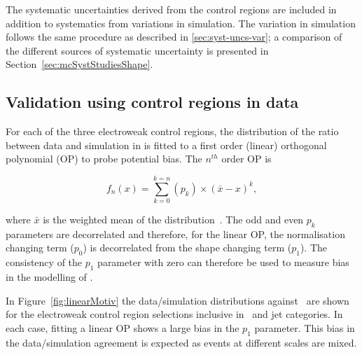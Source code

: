 The systematic uncertainties derived from the control regions
are included in addition to systematics from variations in simulation.
The variation in simulation follows the same procedure as described in
\ref{sec:syst-uncs-var}; a comparison of the different sources of systematic uncertainty
is presented in Section~\ref{sec:mcSystStudiesShape}.

\subsection{Validation using control regions in data}
\label{sec:valid13}

For each of the three electroweak control regions, the distribution of the ratio 
between data and simulation in \mht is fitted to a first order (linear) orthogonal polynomial (OP)
to probe potential bias. The $n^{th}$ order OP is 

\begin{equation}
  \label{equ:orthog-polynomial}
  f_n(x) = \sum_{k=0}^{k=n}{(p_k)\times(\bar{x}-x)^k},
\end{equation}

where $\bar{x}$ is the weighted mean of the distribution~\cite{cohen2013applied}. 
The odd and even $p_k$ parameters are decorrelated and therefore, for the linear OP,
the normalisation changing term ($p_0$) is decorrelated from the shape changing term ($p_1$).
The consistency of the $p_1$ parameter with zero can therefore be used to measure bias in the
modelling of \mht. 

In Figure~\ref{fig:linearMotiv} the data/simulation
distributions against \mht~are shown for the electroweak control region selections 
inclusive in \scalht~and jet categories. In each case, 
fitting a linear OP shows a large bias in the $p_1$ parameter. 
This bias in the data/simulation agreement is expected as events 
at different scales are mixed. 

